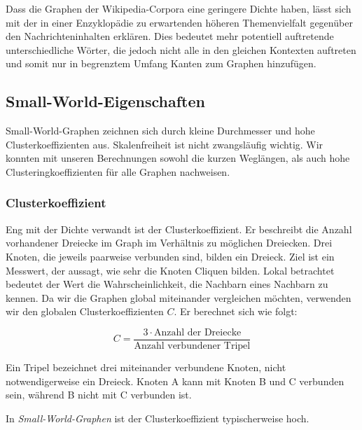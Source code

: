 \documentclass[11pt, a4paper]{article}
\begin{document}
Dass die Graphen der Wikipedia-Corpora eine geringere Dichte haben, lässt sich
mit der in einer Enzyklopädie zu erwartenden höheren Themenvielfalt gegenüber
den Nachrichteninhalten erklären.
Dies bedeutet mehr potentiell auftretende unterschiedliche Wörter, die jedoch
nicht alle in den gleichen Kontexten auftreten und somit nur in begrenztem
Umfang Kanten zum Graphen hinzufügen.


\subsection{Small-World-Eigenschaften}
Small-World-Graphen zeichnen sich durch kleine Durchmesser und
hohe Clusterkoeffizienten aus. Skalenfreiheit ist nicht zwangsläufig wichtig.
Wir konnten mit unseren Berechnungen sowohl die kurzen Weglängen, als auch hohe
Clusteringkoeffizienten für alle Graphen nachweisen.

\subsubsection{Clusterkoeffizient}

Eng mit der Dichte verwandt ist der Clusterkoeffizient. Er beschreibt die
Anzahl vorhandener Dreiecke im Graph im Verhältnis zu möglichen Dreiecken. Drei
Knoten, die jeweils paarweise verbunden sind, bilden ein Dreieck. Ziel ist ein
Messwert, der aussagt, wie sehr die Knoten Cliquen bilden. Lokal betrachtet
bedeutet der Wert die Wahrscheinlichkeit, die Nachbarn eines Nachbarn zu kennen.
Da wir die Graphen global miteinander vergleichen möchten, verwenden wir den
globalen Clusterkoeffizienten $C$. Er berechnet sich wie folgt:

$$
    C = \frac{3\cdot\text{Anzahl der Dreiecke}}{\text{Anzahl verbundener Tripel}}
$$

Ein Tripel bezeichnet drei miteinander verbundene Knoten, nicht
notwendigerweise ein Dreieck. Knoten A kann mit Knoten B und C verbunden sein,
während B nicht mit C verbunden ist.

In \emph{Small-World-Graphen} ist der Clusterkoeffizient typischerweise hoch. 


\end{document}
